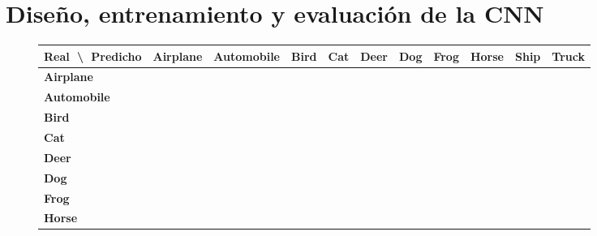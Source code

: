 \documentclass{uc3mpracticas}
\begin{document}
\section{Diseño, entrenamiento y evaluación de la CNN}

\begin{figure}[!h]
\begin{center}
  \begin{tabular}{|g|c|c|c|c|c|c|c|c|c|c|}
    \hline
    Real $\;$\textbackslash  $\;$ Predicho  & \textbf{Airplane} & \textbf{Automobile} & \textbf{Bird} & \textbf{Cat} & \textbf{Deer} & \textbf{Dog} & \textbf{Frog} & \textbf{Horse} & \textbf{Ship} & \textbf{Truck} \\ \hline
            \textbf{Airplane}               &                 &                   &             &            &             &            &             &              &             &                \\ \hline
            \textbf{Automobile}             &                 &                   &             &            &             &            &             &              &             &                \\ \hline
            \textbf{Bird}                   &                 &                   &             &            &             &            &             &              &             &                \\ \hline
            \textbf{Cat}                    &                 &                   &             &            &             &            &             &              &             &                \\ \hline
            \textbf{Deer}                   &                 &                   &             &            &             &            &             &              &             &                \\ \hline
            \textbf{Dog}                    &                 &                   &             &            &             &            &             &              &             &                \\ \hline
            \textbf{Frog}                   &                 &                   &             &            &             &            &             &              &             &                \\ \hline
            \textbf{Horse}                  &                 &                   &             &            &             &            &             &              &             &                \\ \hline

\end{tabular}
\end{center}
\end{figure}
\end{document}
